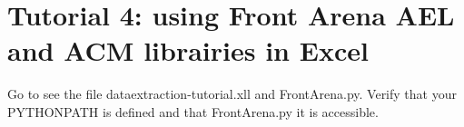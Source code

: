 \chapter{Tutorial 4: using Front Arena AEL and ACM librairies in Excel}

Go to see the file dataextraction-tutorial.xll and FrontArena.py. Verify that your PYTHONPATH is defined and that FrontArena.py it is accessible.
